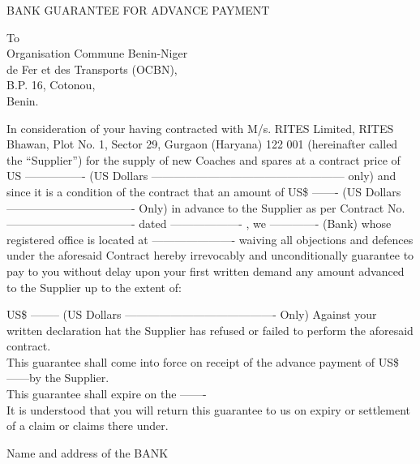 \begin{center} BANK GUARANTEE FOR ADVANCE PAYMENT  \end{center}

\begin{flushleft}
To\\
Organisation Commune Benin-Niger\\
de Fer et des Transports (OCBN),\\
B.P. 16, Cotonou, \\
Benin.
\end{flushleft}

\vskip 2cm
In consideration of your having contracted with M/s. RITES Limited, RITES Bhawan, Plot No. 1, Sector 29, Gurgaon (Haryana) 122 001 (hereinafter called the “Supplier”) for the supply of new Coaches and spares at a contract price of US ----------------
(US Dollars --------------------------------------------------- only) and since it is a condition of the contract that an amount of US\$ ------- (US Dollars ---------------------------------- Only) in advance to the Supplier as per Contract No.---------------------------------- dated ------------------- , we    -------------               (Bank) whose registered office is located at ----------------------  waiving all objections and defences  under the aforesaid Contract hereby irrevocably and unconditionally guarantee to pay to you without delay upon your first written demand any amount advanced to the Supplier up to the extent of:
\vskip 1cm

US\$ -------- (US Dollars ---------------------------------------- Only)  
\vskip 1cm
Against your written declaration hat the Supplier has refused or failed to perform the aforesaid contract.\\

This guarantee shall come into force on receipt of the advance payment of US\$ ------by the Supplier.\\

This guarantee shall expire on the -------\\

It is understood that you will return this guarantee to us on expiry or settlement of a claim or claims there under.\\

\vskip 2cm

Name and address of the BANK

